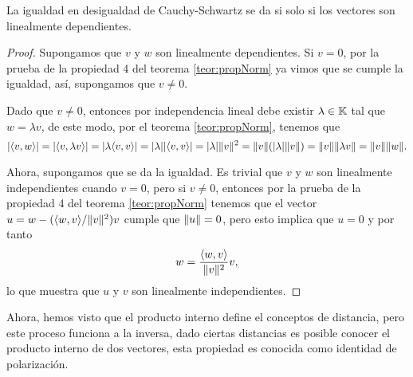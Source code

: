 \begin{coro}
  La igualdad en desigualdad de Cauchy-Schwartz se da si solo si los vectores son linealmente dependientes.
\end{coro}

\begin{proof}
  Supongamos que $v$ y $w$ son linealmente dependientes. Si $v = 0$, por la prueba de la propiedad 4 del teorema \ref{teor:propNorm} ya vimos que se cumple la igualdad, así, supongamos que $v \neq 0$.
  
  Dado que $v \neq 0$, entonces por independencia lineal debe existir $\lambda \in \mathbb{K}$ tal que $w = \lambda v$, de este modo, por el teorema \ref{teor:propNorm}, tenemos que
    \[
      \mathopen|\langle v,w\rangle\mathclose| = \mathopen|\langle v,\lambda v\rangle\mathclose| = \mathopen|\lambda\langle v,v\rangle\mathclose| = \mathopen|\lambda\mathclose| \mathopen|\langle v,v\rangle\mathclose| = \mathopen|\lambda\mathclose| \mathopen\|v\mathclose\|^2 = \mathopen\|v\mathclose\| (\mathopen|\lambda\mathclose| \mathopen\|v\mathclose\|) = \mathopen\|v\mathclose\| \mathopen\|\lambda v\mathclose\| = \mathopen\|v\mathclose\| \mathopen\|w\mathclose\|.
    \]
  
  Ahora, supongamos que se da la igualdad. Es trivial que $v$ y $w$ son linealmente independientes cuando $v = 0$, pero si $v \neq 0$, entonces por la prueba de la propiedad 4 del teorema \ref{teor:propNorm} tenemos que el vector $u = w - (\langle w,v\rangle/\mathopen\|v\mathclose\|^2)v$ cumple que $\mathopen\|u\mathclose\| = 0$, pero esto implica que $u = 0$ y por tanto
    \[ w = \frac{\langle w,v\rangle}{\mathopen\|v\mathclose\|^2} v, \]
  lo que muestra que $u$ y $v$ son linealmente independientes.
\end{proof}

Ahora, hemos visto que el producto interno define el conceptos de distancia, pero este proceso funciona a la inversa, dado ciertas distancias es posible conocer el producto interno de dos vectores, esta propiedad es conocida como identidad de polarización. 

